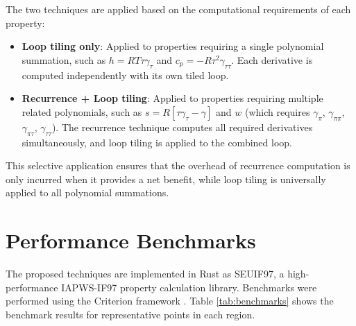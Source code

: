 \documentclass{article}
\begin{document}
The two techniques are applied based on the computational requirements of each property:

\begin{itemize}
    \item \textbf{Loop tiling only}: Applied to properties requiring a single polynomial summation, such as $h = RT\tau\gamma_\tau$ and $c_p = -R\tau^2\gamma_{\tau\tau}$. Each derivative is computed independently with its own tiled loop.
    \item \textbf{Recurrence + Loop tiling}: Applied to properties requiring multiple related polynomials, such as $s = R[\tau\gamma_\tau - \gamma]$ and $w$ (which requires $\gamma_\pi$, $\gamma_{\pi\pi}$, $\gamma_{\pi\tau}$, $\gamma_{\tau\tau}$). The recurrence technique computes all required derivatives simultaneously, and loop tiling is applied to the combined loop.
\end{itemize}

This selective application ensures that the overhead of recurrence computation is only incurred when it provides a net benefit, while loop tiling is universally applied to all polynomial summations.

\section{Performance Benchmarks}

The proposed techniques are implemented in Rust as SEUIF97, a high-performance IAPWS-IF97 property calculation library. Benchmarks were performed using the Criterion framework \cite{Criterion}. Table \ref{tab:benchmarks} shows the benchmark results for representative points in each region.

\begin{table}[H]
\centering
\caption{Performance benchmark results}
\label{tab:benchmarks}
\end{table}
\end{document}
